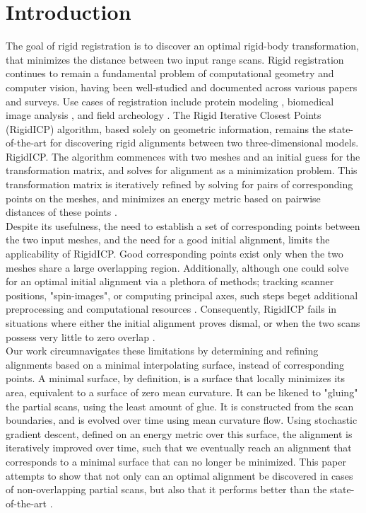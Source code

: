 \documentclass[letterpaper, 10 pt, conference]{ieeeconf}  %
\begin{document}
\section{Introduction}
		The goal of rigid registration is to discover an optimal rigid-body transformation, that minimizes the distance between two input range scans. Rigid registration continues to remain a fundamental problem of computational geometry and computer vision, having been well-studied and documented across various papers and surveys. Use cases of registration include protein modeling \autocite{4407841}, biomedical image analysis \autocite{Zou:2015:TSR:2809654.2766976}, and field archeology \autocite{Huang:2006:RFO:1179352.1141925}. The Rigid Iterative Closest Points (RigidICP) algorithm, based solely on geometric information, remains the state-of-the-art for discovering rigid alignments between two three-dimensional models. RigidICP. The algorithm commences with two meshes and an initial guess for the transformation matrix, and solves for alignment as a minimization problem. This transformation matrix is iteratively refined by solving for pairs of corresponding points on the meshes, and minimizes an energy metric based on pairwise distances of these points \autocite{Chen:1992:OMR:138628.138633}. \\
	\indent Despite its usefulness, the need to establish a set of corresponding points between the two input meshes, and the need for a good initial alignment, limits the applicability of RigidICP. Good corresponding points exist only when the two meshes share a large overlapping region. Additionally, although one could solve for an optimal initial alignment via a plethora of methods; tracking scanner positions, "spin-images", or computing principal axes, such steps beget additional preprocessing and computational resources \autocite{Rusinkiewicz:2001:EVO}. Consequently, RigidICP fails in situations where either the initial alignment proves dismal, or when the two scans possess very little to zero overlap \autocite{Chen:1992:OMR:138628.138633}. \\
	\indent Our work circumnavigates these limitations by determining and refining alignments based on a minimal interpolating surface, instead of corresponding points. A minimal surface, by definition, is a surface that locally minimizes its area, equivalent to a surface of zero mean curvature. It can be likened to "gluing" the partial scans, using the least amount of glue. It is constructed from the scan boundaries, and is evolved over time using mean curvature flow. Using stochastic gradient descent, defined on an energy metric over this surface, the alignment is iteratively improved over time, such that we eventually reach an alignment that corresponds to a minimal surface that can no longer be minimized. This paper attempts to show that not only can an optimal alignment be discovered in cases of non-overlapping partial scans, but also that it performs better than the state-of-the-art	.
    
\end{document}
